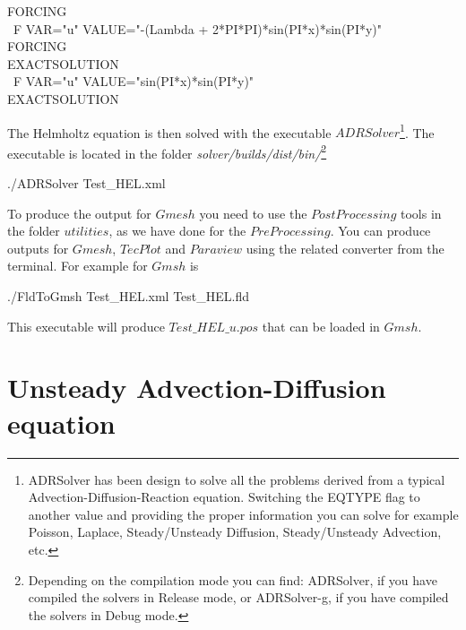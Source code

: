 \documentclass[12pt]{article}
\begin{document}
\begin{enumerate}
\begin{algorithm2e}[H]
    FORCING\\\
      F VAR="u" VALUE="-(Lambda + 2*PI*PI)*sin(PI*x)*sin(PI*y)" \\
    FORCING\\
       
    EXACTSOLUTION\\\
      F VAR="u" VALUE="sin(PI*x)*sin(PI*y)" \\
    EXACTSOLUTION\\
\end{algorithm2e}
\end{enumerate}

\noindent            
The Helmholtz equation is then solved with the executable $ADRSolver$\footnote{ADRSolver has been design to solve all the problems derived from a typical Advection-Diffusion-Reaction equation. Switching the EQTYPE flag to another value and providing the proper information you can solve for example Poisson, Laplace, Steady/Unsteady Diffusion, Steady/Unsteady Advection, etc.}.
The executable is located in the folder \emph{solver/builds/dist/bin/}\footnote{Depending on the compilation mode you can find: ADRSolver, if you have compiled the solvers in Release mode, or ADRSolver-g, if you have compiled the solvers in Debug mode.}

\vspace{5mm}
\begin{algorithm2e}[H]
./ADRSolver Test\_HEL.xml
\end{algorithm2e}
\vspace{5mm}

\noindent
To produce the output for $Gmesh$ you need to use the $PostProcessing$ tools in the folder $utilities$, as we have done for the $PreProcessing$.
You can produce outputs for $Gmesh$, $TecPlot$ and $Paraview$ using the related converter from the terminal. For example for $Gmsh$ is

 \vspace{5mm}
\begin{algorithm2e}[H]
./FldToGmsh Test\_HEL.xml Test\_HEL.fld 
\end{algorithm2e}
\vspace{5mm}

\noindent
This executable will produce $Test\_HEL\_u.pos$ that can be loaded in $Gmsh$.

\section{Unsteady Advection-Diffusion equation}
\end{document}
